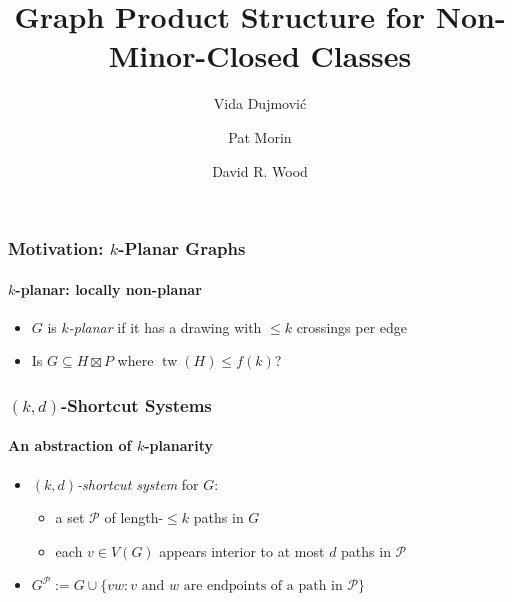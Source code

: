 \documentclass[xcolor=dvipsnames]{beamer}
\title[$k$-planar product structure]{Graph Product Structure for Non-Minor-Closed Classes}
\author[Dujmović, M, Wood]{Vida Dujmović \and Pat Morin \and David R. Wood}
\DeclareMathOperator{\tw}{tw}
\begin{document}
\begin{frame}
  \titlepage
\end{frame}

%

\begin{frame}
    \frametitle{Motivation: $k$-Planar Graphs}
    \framesubtitle{$k$-planar: locally non-planar}

    \begin{itemize}
        \item $G$ is \emph{$k$-planar} if it has a drawing with $\le\!\! k$ crossings per edge
        \begin{center}
        \end{center}
        \item<4-> Is $G\subseteq H\boxtimes P$ where $\tw(H)\le f(k)$?
    \end{itemize}
\end{frame}

\begin{frame}
    \frametitle{$(k,d)$-Shortcut Systems}
    \framesubtitle{An abstraction of $k$-planarity}

    \begin{itemize}
        \item \emph{$(k,d)$-shortcut system} for $G$:
        \begin{itemize}
            \item<2-> a set $\mathcal{P}$ of length-$\le\!\! k$ paths in $G$
            \item<2-> each $v\in V(G)$ appears interior to at most $d$ paths in $\mathcal{P}$
        \end{itemize}
    \end{itemize}
    \begin{center}
    \end{center}
    \begin{itemize}
        \item<3-> $G^{\mathcal{P}}:= G\cup\{vw:\mbox{$v$ and $w$ are endpoints of a path in $\mathcal{P}$}\}$
    \end{itemize}
\end{frame}
\end{document}
